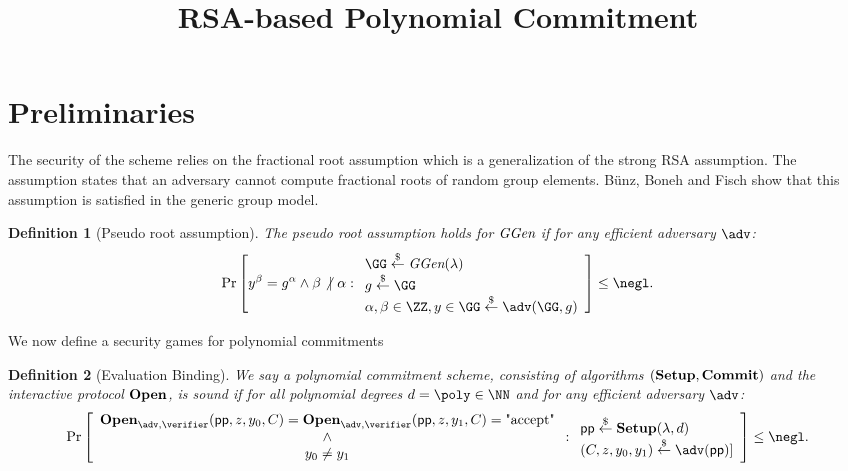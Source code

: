 \documentclass{article}
\newtheorem{definition}{Definition}
\begin{document}
\title{RSA-based Polynomial Commitment}
\maketitle
\section{Preliminaries}
The security of the scheme relies on the fractional root assumption which is a generalization of the strong RSA assumption. The assumption states that an adversary cannot compute fractional roots of random group elements. B\"unz, Boneh and Fisch \cite{accumulator} show that this assumption is satisfied in the generic group model.  
\begin{definition}[Pseudo root assumption]
The pseudo root assumption holds for $\textit{GGen}$ if for any efficient adversary $\adv$:
\[        
                \Pr\left[y^\beta = g^{\alpha} \wedge  \beta \not\vert~ \alpha   : 
                \begin{array}{l} 
                      \GG \sample \ggen(\lambda) \\ 
                      g \sample \GG \\
                      \alpha, \beta \in \ZZ,y\in \GG \sample \adv(\GG, g) 
                \end{array} 
        \right] \leq \negl.
\]
\end{definition}
We now define a security games for polynomial commitments


\begin{definition}[Evaluation Binding]
We say a polynomial commitment scheme, consisting of algorithms $(\textbf{{Setup}},\textbf{{Commit}})$ and the interactive protocol $\textbf{{Open}}$, is sound if for all polynomial degrees $d=\poly\in \NN$ and for any efficient adversary $\adv$:
	\[        
                \Pr\left[\begin{array}{c}\open_{\adv,\verifier}(\crs,z,y_0,C)=\open_{\adv,\verifier}(\crs,z,y_1,C)=\text{"accept"}\\
                \wedge\\
                y_0\neq y_1\end{array}  : 
                \begin{array}{l} 
                      \crs \sample \setup(\lambda, d) \\
                      (C,z,y_0,y_1)\sample \adv(\crs)]
                \end{array} 
        \right] \leq \negl.
\]
\end{definition}
\end{document}
